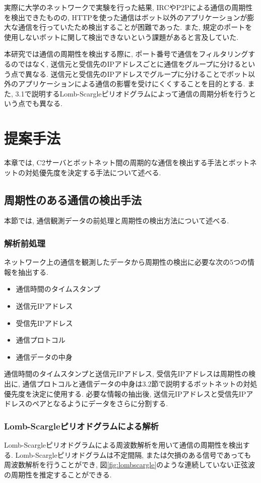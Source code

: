 \documentclass[twocolumn,9pt]{ltjsarticle}
\begin{document}
実際に大学のネットワークで実験を行った結果, IRCやP2Pによる通信の周期性を検出できたものの, HTTPを使った通信はボット以外のアプリケーションが膨大な通信を行っていたため検出することが困難であった. また, 規定のポートを使用しないボットに関して検出できないという課題があると言及していた. 

本研究では通信の周期性を検出する際に, ポート番号で通信をフィルタリングするのではなく, 送信元と受信先のIPアドレスごとに通信をグループに分けるという点で異なる. 送信元と受信先のIPアドレスでグループに分けることでボット以外のアプリケーションによる通信の影響を受けにくくすることを目的とする. また, 3.1で説明するLomb-Scargleピリオドグラムによって通信の周期分析を行うという点でも異なる. 

\section{提案手法}
本章では, C2サーバとボットネット間の周期的な通信を検出する手法とボットネットの対処優先度を決定する手法について述べる. 

\subsection{周期性のある通信の検出手法}
本節では, 通信観測データの前処理と周期性の検出方法について述べる. 

\subsubsection{解析前処理}
ネットワーク上の通信を観測したデータから周期性の検出に必要な次の5つの情報を抽出する. 

\begin{itemize}
    \item 通信時間のタイムスタンプ
    \item 送信元IPアドレス
    \item 受信先IPアドレス
    \item 通信プロトコル
    \item 通信データの中身
\end{itemize}

通信時間のタイムスタンプと送信元IPアドレス, 受信先IPアドレスは周期性の検出に, 通信プロトコルと通信データの中身は3.2節で説明するボットネットの対処優先度を決定に使用する. 必要な情報の抽出後, 送信元IPアドレスと受信先IPアドレスのペアとなるようにデータをさらに分割する. 

\subsubsection{Lomb-Scargleピリオドグラムによる解析}
Lomb-Scargleピリオドグラムによる周波数解析\cite{vanderplas2018understanding}を用いて通信の周期性を検出する. Lomb-Scargleピリオドグラムは不定間隔, または欠損のある信号であっても周波数解析を行うことができ, 図\ref{fig:lombscargle}のような連続していない正弦波の周期性を推定することができる. 
\end{document}
